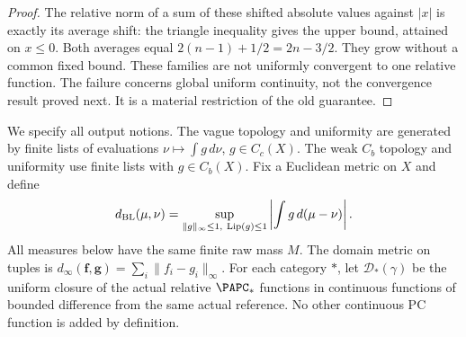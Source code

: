 \begin{proof}
The relative norm of a sum of these shifted absolute values against
$|x|$ is exactly its average shift: the triangle inequality gives the
upper bound, attained on $x\leq0$. Both averages equal
$2(n-1)+1/2=2n-3/2$. They grow without a common fixed bound. These
families are not uniformly convergent to one relative function. The
failure concerns global uniform continuity, not the convergence result
proved next. It is a material restriction of the old guarantee.
\end{proof}

We specify all output notions. The vague topology and uniformity are
generated by finite lists of evaluations $\nu\mapsto\int g\,d\nu$,
$g\in C_c(X)$. The weak $C_b$ topology and uniformity use finite lists
with $g\in C_b(X)$. Fix a Euclidean metric on $X$ and define
\[
 d_{\rm BL}(\mu,\nu)=\sup_{\|g\|_\infty\leq1,\ \operatorname{Lip}(g)\leq1}
              \left|\int g\,d(\mu-\nu)\right|.
\]
All measures below have the same finite raw mass $M$. The domain metric
on tuples is $d_\infty(\mathbf f,\mathbf g)=\sum_i\|f_i-g_i\|_\infty$.
For each category $*$, let $\mathcal D_*(\gamma)$ be the uniform closure
of the actual relative $\PAPC_*$ functions in continuous functions of
bounded difference from the same actual reference. No other continuous
PC function is added by definition.

